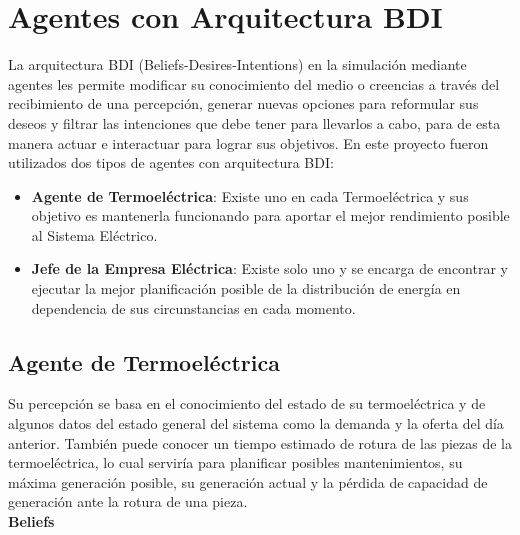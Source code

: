 \documentclass[twocolumn, fontsize=10pt]{article}
\begin{document}
\section{Agentes con Arquitectura BDI}

La arquitectura BDI (Beliefs-Desires-Intentions) en la simulación mediante agentes
les permite modificar su conocimiento del medio o creencias a través del recibimiento
de una percepción, generar nuevas opciones para reformular sus deseos y filtrar las intenciones
que debe tener para llevarlos a cabo, para de esta manera actuar e interactuar para lograr sus objetivos. \cite{book}
En este proyecto fueron utilizados dos tipos de agentes con arquitectura BDI:
\begin{itemize}
  \item \textbf{Agente de Termoeléctrica}: Existe uno en cada Termoeléctrica y sus objetivo es mantenerla funcionando para aportar el mejor rendimiento posible al Sistema Eléctrico.
  \item \textbf{Jefe de la Empresa Eléctrica}: Existe solo uno y se encarga de encontrar y ejecutar la mejor planificación posible de la distribución de energía en dependencia de sus circunstancias en cada momento.
\end{itemize}

\subsection{Agente de Termoeléctrica}
Su percepción se basa en el conocimiento del estado de su 
termoeléctrica y de algunos datos del estado general del 
sistema como la demanda y la oferta del día anterior. 
También puede conocer un tiempo estimado de rotura de las 
piezas de la termoeléctrica, lo cual serviría para planificar 
posibles mantenimientos, su máxima generación posible, su generación actual y
la pérdida de capacidad de generación ante la rotura de una pieza.\\
\textbf{Beliefs}
\end{document}
